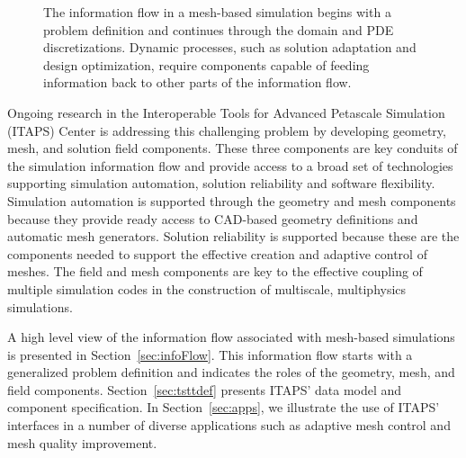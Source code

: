 \begin{figure}
\begin{center}
\caption{The information flow in a mesh-based simulation begins with
a problem definition and continues through the domain and PDE
discretizations.  Dynamic processes, such as solution adaptation and
design optimization, require components capable of feeding information
back to other parts of the information flow.}
\label{fig:infoFlow}
\end{center}
\end{figure}
 
Ongoing research in the Interoperable Tools for Advanced Petascale Simulation 
(ITAPS) Center is addressing this challenging problem by developing
geometry, mesh, and solution field components.
These three components are key conduits of the simulation information
flow and provide access to a broad set of technologies supporting
simulation automation, solution reliability and software flexibility.
Simulation automation is supported through the geometry and mesh
components because they provide ready access to CAD-based geometry
definitions and automatic mesh generators. Solution reliability is
supported because these are the components needed to support the
effective creation and adaptive control of meshes. The field and mesh
components are key to the effective coupling of multiple simulation
codes in the construction of multiscale, multiphysics simulations. 

A high level view of the information flow associated with mesh-based
simulations is presented in Section~\ref{sec:infoFlow}. This
information flow starts with a generalized problem definition and
indicates the roles of the geometry, mesh, and field components.
Section~\ref{sec:tsttdef} presents ITAPS' data model and component
specification.  In Section~\ref{sec:apps}, we illustrate the use of
ITAPS' interfaces in a number of diverse applications such as 
adaptive mesh control and mesh quality improvement.
